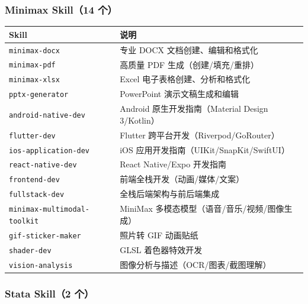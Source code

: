 \documentclass[12pt,a4paper]{ctexart}
\begin{document}
\vspace{8pt}

\subsubsection*{Minimax Skill（14 个）}

{
\centering
\small
\begin{tabular}{>{\RaggedRight\arraybackslash}p{5.2cm}>{\RaggedRight\arraybackslash}p{9.3cm}}
\toprule
\textbf{Skill} & \textbf{说明} \\
\midrule
\texttt{minimax-docx} & 专业 DOCX 文档创建、编辑和格式化 \\
\midrule
\texttt{minimax-pdf} & 高质量 PDF 生成（创建/填充/重排） \\
\midrule
\texttt{minimax-xlsx} & Excel 电子表格创建、分析和格式化 \\
\midrule
\texttt{pptx-generator} & PowerPoint 演示文稿生成和编辑 \\
\midrule
\texttt{android-native-dev} & Android 原生开发指南（Material Design 3/Kotlin） \\
\midrule
\texttt{flutter-dev} & Flutter 跨平台开发（Riverpod/GoRouter） \\
\midrule
\texttt{ios-application-dev} & iOS 应用开发指南（UIKit/SnapKit/SwiftUI） \\
\midrule
\texttt{react-native-dev} & React Native/Expo 开发指南 \\
\midrule
\texttt{frontend-dev} & 前端全栈开发（动画/媒体/文案） \\
\midrule
\texttt{fullstack-dev} & 全栈后端架构与前后端集成 \\
\midrule
\texttt{minimax-multimodal-toolkit} & MiniMax 多模态模型（语音/音乐/视频/图像生成） \\
\midrule
\texttt{gif-sticker-maker} & 照片转 GIF 动画贴纸 \\
\midrule
\texttt{shader-dev} & GLSL 着色器特效开发 \\
\midrule
\texttt{vision-analysis} & 图像分析与描述（OCR/图表/截图理解） \\
\bottomrule
\end{tabular}
\par}

\vspace{8pt}

\subsubsection*{Stata Skill（2 个）}
\end{document}
